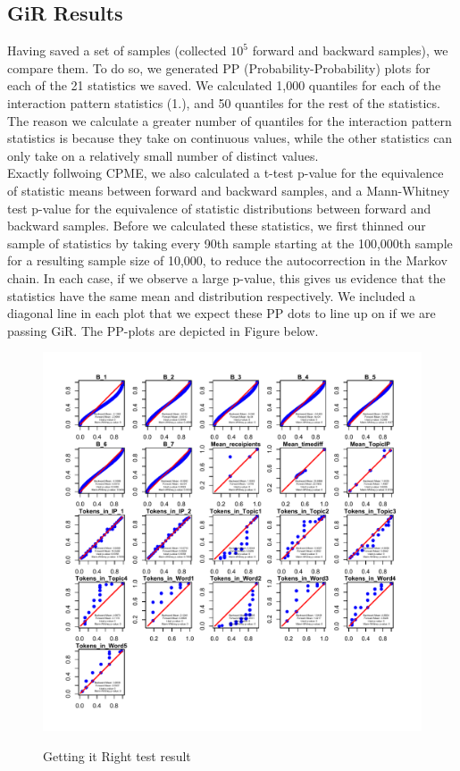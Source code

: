 \documentclass[a4paper]{article}
\begin{document}
\subsection{GiR Results}
Having saved a set of samples (collected $10^5$ forward and backward samples), we compare them. To do so, we generated PP (Probability-Probability)  plots for each of the 21 statistics we saved. We calculated 1,000 quantiles for each of the interaction pattern statistics (1.), and 50 quantiles for the rest of the statistics. The reason
we calculate a greater number of quantiles for the interaction pattern statistics is because they take on continuous values, while the other
statistics can only take on a relatively small number of distinct values. \\ \newline
Exactly follwoing CPME, we also calculated a t-test p-value for the equivalence
of statistic means between forward and backward samples, and a Mann-Whitney test p-value for the equivalence of statistic
distributions between forward and backward samples. Before we calculated these statistics, we first thinned our sample of
statistics by taking every 90th sample starting at the 100,000th sample for a resulting sample size of 10,000, to reduce the autocorrection in the Markov chain. In each case, if we observe a large p-value, this gives us
evidence that the statistics have the same mean and distribution respectively. We included a diagonal line in each plot that we
expect these PP dots to line up on if we are passing GiR. The PP-plots are depicted in Figure below.
\begin{figure}[ht]
	\centering
	\includegraphics[width=1\textwidth]{GiR500000.pdf} 
	\label{fig:GiR}
	\caption{Getting it Right test result}
\end{figure}
\end{document}
